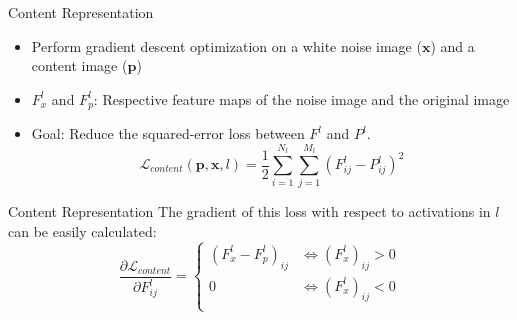 \documentclass{beamer}
\begin{document}
\begin{frame}{Content Representation}
    \begin{itemize}
        \item Perform gradient descent optimization on a white noise image
            ($\mathbf{x}$) and a content image ($\mathbf{p}$)
        \item $F_x^l$ and $F_p^l$: Respective feature maps of the noise image
            and the original image
        \item Goal: Reduce the squared-error loss between $F^l$ and $P^l$.
    \begin{equation}
        \mathcal{L}_{content}(\mathbf{p}, \mathbf{x}, l) =
        \frac{1}{2} \sum_{i=1}^{N_l}\sum_{j=1}^{M_l}{(F^l_{ij} - P^l_{ij})^2}
    \end{equation}
    \end{itemize}
\end{frame}



\begin{frame}{Content Representation}
    The gradient of this loss with respect to activations in $l$ can be easily
    calculated:
    \begin{equation}
        \frac{\partial \mathcal{L}_{content}}{\partial F^l_{ij}}
        =
        \begin{cases}
            (F^l_x - F^l_p)_{ij} & \iff (F^l_x)_{ij} > 0 \\
            0 & \iff (F^l_x)_{ij} < 0 \\
        \end{cases}
    \end{equation}
\end{frame}
\end{document}
